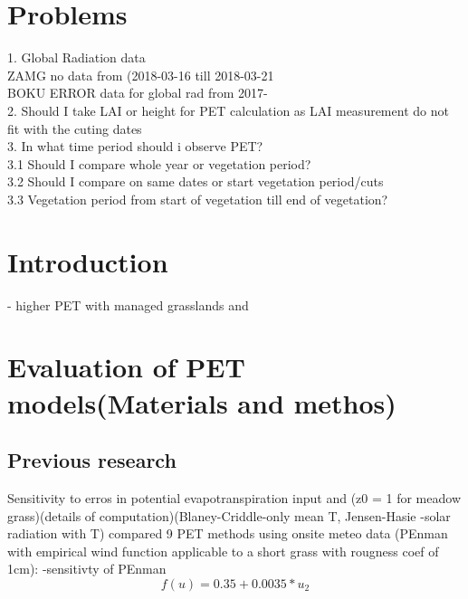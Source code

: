 \documentclass[hydrology,article,submit,moreauthors,pdftex]{Definitions/mdpi}
\begin{document}

\setcounter{section}{-1} %




\section{Problems}

1. Global Radiation data \\
ZAMG no data from (2018-03-16 till 2018-03-21 \\
BOKU ERROR data for global rad from 2017-
\\

2. Should I take LAI or height for PET calculation as LAI measurement do not fit with the cuting dates
\\

3. In what time period should i observe PET? \\
3.1 Should I compare whole year or vegetation period? \\
3.2 Should I compare on same dates or start vegetation period/cuts \\
3.3 Vegetation period from start of vegetation till end of vegetation? \\

\section{Introduction}
\cite{obojes2015vegetation} - higher PET with managed grasslands and \cite{leitinger2015impact}


\section{Evaluation of PET models(Materials and methos)}

\subsection{Previous research}
Sensitivity to erros in potential evapotranspiration input \cite{parmele1972errors}
\cite{parmele1974comparisons} and \cite{mcguinness1972comparison}(z0 = 1 for meadow grass)(details of computation)(Blaney-Criddle-only mean T, Jensen-Hasie \cite{jensen1963estimating}-solar radiation with T) compared 9 PET methods using onsite meteo data
(PEnman with empirical wind function applicable to a short grass with rougness coef of 1cm): 
\cite{andreassian2004impact}-sensitivty of PEnman
\begin{equation}
f(u)=0.35+0.0035*u_2
\end{equation}
\end{document}
